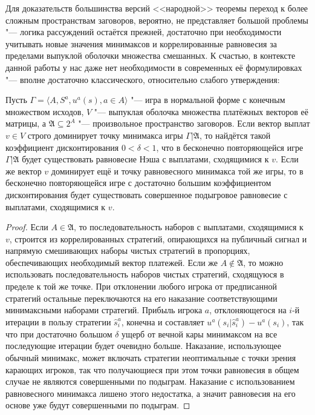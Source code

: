 Для доказательств большинства версий <<народной>> теоремы переход к более сложным пространствам заговоров, вероятно, не представляет большой проблемы "--- логика рассуждений остаётся прежней, достаточно при необходимости учитывать новые значения минимаксов и коррелированные равновесия за пределами выпуклой оболочки множества смешанных. К счастью, в контексте данной работы у нас даже нет необходимости в современных её формулировках "--- вполне достаточно классического, относительно слабого утверждения:
\begin{theorem}
	Пусть $\Gamma = \langle A, S^a, u^a(s), a \in A \rangle$ "--- игра в нормальной форме с конечным множеством исходов, $V$ "--- выпуклая оболочка множества платёжных векторов её матрицы, а $\mathfrak{A} \subseteq 2^A$ "--- произвольное пространство заговоров. Если вектор выплат $v \in V$ строго доминирует точку минимакса игры $\Gamma | \mathfrak{A}$, то найдётся такой коэффициент дисконтирования $0 < \delta < 1$, что в бесконечно повторяющейся игре $\Gamma | \mathfrak{A}$ будет существовать равновесие Нэша с выплатами, сходящимися к $v$. Если же вектор $v$ доминирует ещё и точку равновесного минимакса той же игры, то в бесконечно повторяющейся игре с достаточно большим коэффициентом дисконтирования будет существовать совершенное подыгровое равновесие с выплатами, сходящимися к $v$.
\end{theorem}
\begin{proof}
	Если $A \in \mathfrak{A}$, то последовательность наборов с выплатами, сходящимися к $v$, строится из коррелированных стратегий, опирающихся на публичный сигнал и напрямую смешивающих наборы чистых стратегий в пропорциях, обеспечивающих необходимый вектор платежей. Если же $A \notin \mathfrak{A}$, то можно использовать последовательность наборов чистых стратегий, сходящуюся в пределе к той же точке. При отклонении любого игрока от предписанной стратегий остальные переключаются на его наказание соответствующими минимаксными наборами стратегий. Прибыль игрока $a$, отклоняющегося на $i$-й итерации в пользу стратегии $\hat{s}^a_i$, конечна и составляет $u^a(s_i | \hat{s}^a_i) - u^a(s_i)$, так что при достаточно большом $\delta$ ущерб от вечной кары минимаксом на все последующие итерации будет очевидно больше. Наказание, использующее обычный минимакс, может включать стратегии неоптимальные с точки зрения карающих игроков, так что получающиеся при этом точки равновесия в общем случае не являются совершенными по подыграм. Наказание с использованием равновесного минимакса лишено этого недостатка, а значит равновесия на его основе уже будут совершенными по подыграм.	
\end{proof}

